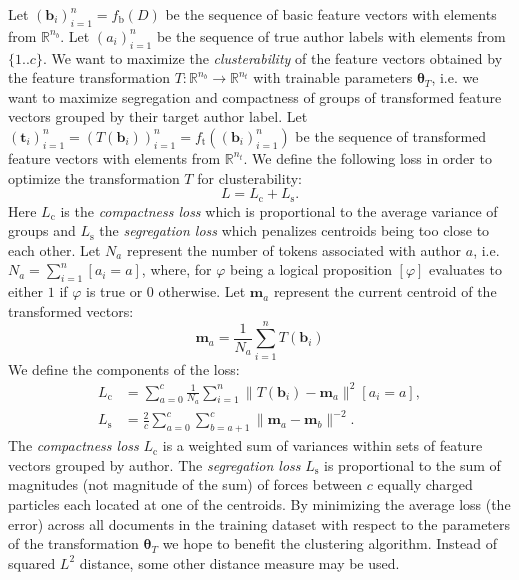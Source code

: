 \documentclass[10pt, a4paper]{article}
\newcommand{\vect}[1]{\bm{#1}}
\begin{document}
Let $(\vect{b}_i)_{i=1}^n = f_\mathrm{b}(D)$ be the sequence of basic feature vectors with elements from $\mathbb{R}^{n_b}$. Let $(a_i)_{i=1}^n$ be the sequence of true author labels with elements from $\{1..c\}$. We want to maximize the \emph{clusterability} of the feature vectors obtained by the feature transformation $T:\mathbb{R}^{n_b}\rightarrow\mathbb{R}^{n_t}$ with trainable parameters $\vect{\theta}_T$, i.e. we want to maximize segregation and compactness of groups of transformed feature vectors grouped by their target author label. Let $(\vect{t}_i)_{i=1}^n = (T(\boldsymbol{b}_i))_{i=1}^n = f_\mathrm{t}((\vect{b}_i)_{i=1}^n)$ be the sequence of transformed feature vectors with elements from $\mathbb{R}^{n_t}$. We define the following loss in order to optimize the transformation $T$ for clusterability:
\begin{equation}
	L = L_\mathrm{c} + L_\mathrm{s}.
\end{equation}
Here $L_\mathrm{c}$ is the \emph{compactness loss} which is proportional to the average variance of groups and $L_\mathrm{s}$ the \emph{segregation loss} which penalizes centroids being too close to each other. Let $N_a$ represent the number of tokens associated with author $a$, i.e. $N_a = \sum_{i=1}^n[a_i=a]$, where, for $\varphi$ being a logical proposition $[\varphi]$ evaluates to either $1$ if $\varphi$ is true or $0$ otherwise.
Let $\vect{m}_a$ represent the current centroid of the transformed vectors:
\begin{equation}
\vect{m}_a = \frac{1}{N_a}\sum_{i=1}^n T(\vect{b}_i)
\end{equation}	
We define the components of the loss: 
\begin{align}
	L_\mathrm{c} &= \sum_{a=0}^{c}\frac{1}{N_a} 
		\sum_{i=1}^{n} \| T(\vect{b}_i)-\vect{m}_{a}\|^2 [a_i=a], \\
	L_\mathrm{s} &= \frac{2}{c}\sum_{a=0}^{c}\sum_{b=a+1}^{c} \|\vect{m}_a-\vect{m}_b\|^{-2}.
\end{align}
The \emph{compactness loss} $L_\mathrm{c}$ is a weighted sum of variances within sets of feature vectors grouped by author. The \emph{segregation loss}  $L_\mathrm{s}$ is proportional to the sum of magnitudes (not magnitude of the sum) of forces between $c$ equally charged particles each located at one of the centroids. By minimizing the average loss (the error) across all documents in the training dataset with respect to the parameters of the transformation $\vect{\theta}_T$ we hope to benefit the clustering algorithm. Instead of squared $L^2$ distance, some other distance measure may be used.
\end{document}
